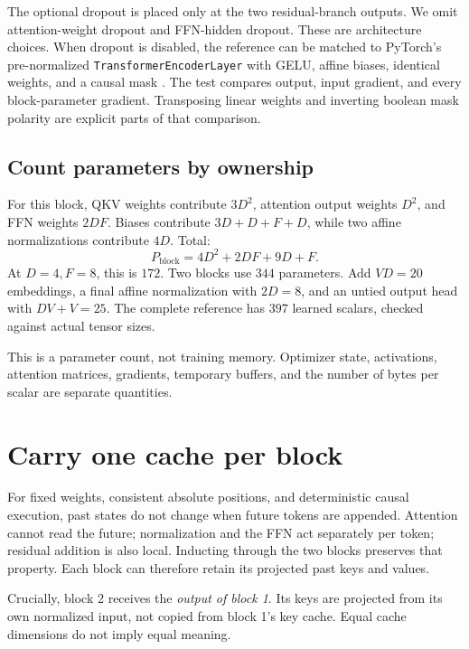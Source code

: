 The optional dropout is placed only at the two residual-branch outputs. We omit attention-weight dropout and FFN-hidden dropout. These are architecture choices. When dropout is disabled, the reference can be matched to PyTorch's pre-normalized \texttt{TransformerEncoderLayer} with GELU, affine biases, identical weights, and a causal mask \cite{encoder}. The test compares output, input gradient, and every block-parameter gradient. Transposing linear weights and inverting boolean mask polarity are explicit parts of that comparison.

\subsection{Count parameters by ownership}
For this block, QKV weights contribute $3D^2$, attention output weights $D^2$, and FFN weights $2DF$. Biases contribute $3D+D+F+D$, while two affine normalizations contribute $4D$. Total:
\begin{equation}
P_{\mathrm{block}}=4D^2+2DF+9D+F.
\end{equation}
At $D=4,F=8$, this is $172$. Two blocks use $344$ parameters. Add $VD=20$ embeddings, a final affine normalization with $2D=8$, and an untied output head with $DV+V=25$. The complete reference has $397$ learned scalars, checked against actual tensor sizes.

This is a parameter count, not training memory. Optimizer state, activations, attention matrices, gradients, temporary buffers, and the number of bytes per scalar are separate quantities.

\section{Carry one cache per block}
For fixed weights, consistent absolute positions, and deterministic causal execution, past states do not change when future tokens are appended. Attention cannot read the future; normalization and the FFN act separately per token; residual addition is also local. Inducting through the two blocks preserves that property. Each block can therefore retain its projected past keys and values.

Crucially, block 2 receives the \emph{output of block 1}. Its keys are projected from its own normalized input, not copied from block 1's key cache. Equal cache dimensions do not imply equal meaning.


